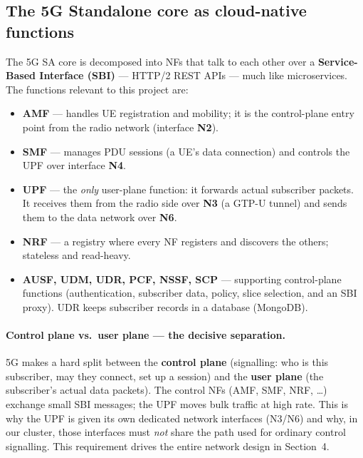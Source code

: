 \subsection{The 5G Standalone core as cloud-native functions}

The 5G SA core \cite{ts23501} is decomposed into NFs that talk to each other
over a \textbf{Service-Based Interface (SBI)} --- HTTP/2 REST APIs --- much
like microservices. The functions relevant to this project are:

\begin{itemize}
    \item \textbf{AMF} --- handles UE registration and mobility; it is the
          control-plane entry point from the radio network (interface
          \textbf{N2}).
    \item \textbf{SMF} --- manages PDU sessions (a UE's data connection) and
          controls the UPF over interface \textbf{N4}.
    \item \textbf{UPF} --- the \emph{only} user-plane function: it forwards
          actual subscriber packets. It receives them from the radio side over
          \textbf{N3} (a GTP-U tunnel) and sends them to the data network over
          \textbf{N6}.
    \item \textbf{NRF} --- a registry where every NF registers and discovers
          the others; stateless and read-heavy.
    \item \textbf{AUSF, UDM, UDR, PCF, NSSF, SCP} --- supporting control-plane
          functions (authentication, subscriber data, policy, slice selection,
          and an SBI proxy). UDR keeps subscriber records in a database
          (MongoDB).
\end{itemize}

\paragraph{Control plane vs.\ user plane --- the decisive separation.}
5G makes a hard split between the \textbf{control plane} (signalling: who is
this subscriber, may they connect, set up a session) and the \textbf{user
plane} (the subscriber's actual data packets). The control NFs (AMF, SMF, NRF,
\ldots) exchange small SBI messages; the UPF moves bulk traffic at high rate.
This is why the UPF is given its own dedicated network interfaces (N3/N6) and
why, in our cluster, those interfaces must \emph{not} share the path used for
ordinary control signalling. This requirement drives the entire network design
in Section~4.


